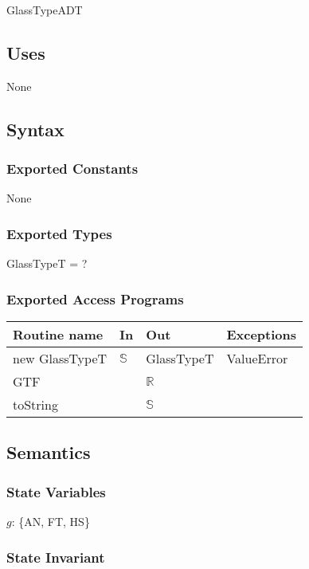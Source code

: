 \documentclass[12pt, titlepage]{article}
\begin{document}
GlassTypeADT

\subsection {Uses}

None

\subsection {Syntax}

\subsubsection {Exported Constants}

None

\subsubsection {Exported Types}

GlassTypeT = ?

\subsubsection {Exported Access Programs}

\begin{tabular}{| l | l | l | p{5cm} |}
\hline
\textbf{Routine name} & \textbf{In} & \textbf{Out} & \textbf{Exceptions}\\
\hline
new GlassTypeT & $\mathbb{S}$ & GlassTypeT & ValueError\\
\hline
GTF & ~ & $\mathbb{R}$ & ~\\
\hline
toString & ~ & $\mathbb{S}$ & ~\\
\hline
\end{tabular}

\subsection {Semantics}

\subsubsection {State Variables}

$g$: \{AN, FT, HS\}

\subsubsection {State Invariant}
\end{document}
